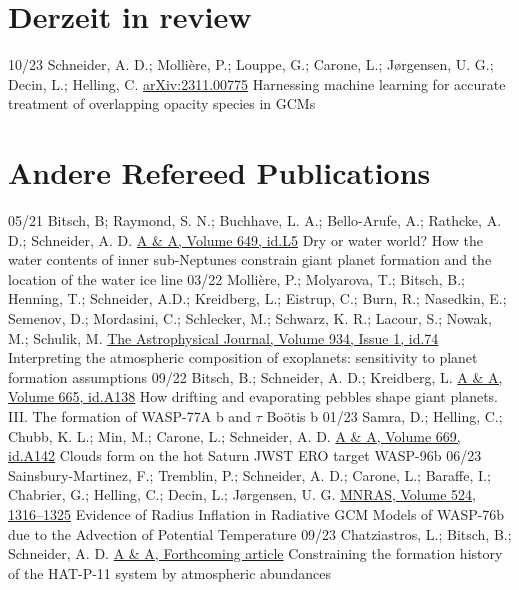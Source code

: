 \documentclass[]{friggeri-cv}
\begin{document}
\section{Derzeit in review}
\begin{entrylist}
  \entry
  	{10/23}
    {Schneider, A. D.; Molli\`ere, P.; Louppe, G.; Carone, L.; J{\o}rgensen, U. G.; Decin, L.; Helling, C.}
    {\href{https://arxiv.org/abs/2311.00775}{arXiv:2311.00775}}
    {Harnessing machine learning for accurate treatment of overlapping opacity species in GCMs}  
\end{entrylist}

\section{Andere Refereed Publications}
\begin{entrylist}
  \entry
    {05/21}
    {Bitsch, B; Raymond, S. N.; Buchhave, L. A.; Bello-Arufe, A.; Rathcke, A. D.; Schneider, A. D.}
    {\href{https://arxiv.org/abs/2104.11631}{A \& A, Volume 649, id.L5}}
    {Dry or water world? How the water contents of inner sub-Neptunes constrain giant planet formation and the location of the water ice line}
  \entry
    {03/22}
    {Mollière, P.; Molyarova, T.; Bitsch, B.; Henning, T.; Schneider, A.D.; Kreidberg, L.; Eistrup, C.; Burn, R.; Nasedkin, E.; Semenov, D.; Mordasini, C.; Schlecker, M.; Schwarz, K. R.; Lacour, S.; Nowak, M.; Schulik, M.}
    {\href{https://arxiv.org/abs/2204.13714}{The Astrophysical Journal, Volume 934, Issue 1, id.74}}
    {Interpreting the atmospheric composition of exoplanets: sensitivity to planet formation assumptions}
  \entry
  	{09/22}
  	{Bitsch, B.; Schneider, A. D.; Kreidberg, L.}
  	{\href{https://arxiv.org/abs/2207.06077}{A \& A, Volume 665, id.A138}}
  	{How drifting and evaporating pebbles shape giant planets. III. The formation of WASP-77A b and \(\tau \) Boötis b}
  \entry
  	{01/23}
  	{{Samra}, D.; {Helling}, C.; {Chubb}, K. L.; {Min}, M.; {Carone}, L.; {Schneider}, A. D.}
  	{\href{https://arxiv.org/abs/2211.00633}{A \& A, Volume 669, id.A142}}
  	{Clouds form on the hot Saturn JWST ERO target WASP-96b}
  \entry
  	{06/23}
  	{{Sainsbury-Martinez}, F.; {Tremblin}, P.; {Schneider}, A. D.; {Carone}, L.; {Baraffe}, I.; {Chabrier}, G.; {Helling}, C.; {Decin}, L.; {J{\o}rgensen}, U. G.}
  	{\href{https://arxiv.org/abs/2306.12352}{MNRAS, Volume 524, 1316–1325}}
  	{Evidence of Radius Inflation in Radiative GCM Models of WASP-76b due to the Advection of Potential Temperature}
  	\entry
  	{09/23}
  	{{Chatziastros}, L.; {Bitsch}, B.; {Schneider}, A. D.}
  	{\href{https://arxiv.org/abs/2310.12797}{A \& A, Forthcoming article}}
  	{Constraining the formation history of the HAT-P-11 system by atmospheric abundances}
\end{entrylist}
\end{document}
